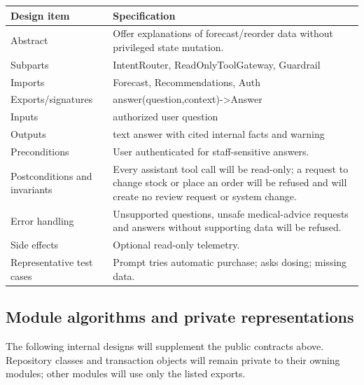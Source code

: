 {\def\LTcaptype{none} %
\begin{longtable}[]{|
  >{\raggedright\arraybackslash}m{}|
  >{\raggedright\arraybackslash}m{}|}
\hline
\begin{minipage}[c]{\linewidth}\raggedright
\textbf{Design item}
\end{minipage} & \begin{minipage}[c]{\linewidth}\raggedright
\textbf{Specification}
\end{minipage} \\
\hline
\endhead

\endlastfoot
Abstract & Offer explanations of forecast/reorder data without privileged state mutation. \\ \hline
Subparts & IntentRouter, ReadOnlyToolGateway, Guardrail \\ \hline
Imports & Forecast, Recommendations, Auth \\ \hline
Exports/signatures & answer(question,context)-\textgreater Answer \\ \hline
Inputs & authorized user question \\ \hline
Outputs & text answer with cited internal facts and warning \\ \hline
Preconditions & User authenticated for staff-sensitive answers. \\ \hline
Postconditions and invariants & Every assistant tool call will be read-only; a request to change stock or place an order will be refused and will create no review request or system change. \\ \hline
Error handling & Unsupported questions, unsafe medical-advice requests and answers without supporting data will be refused. \\ \hline
Side effects & Optional read-only telemetry. \\ \hline
Representative test cases & Prompt tries automatic purchase; asks dosing; missing data. \\ \hline
\end{longtable}
}

\subsection{Module algorithms and private representations}\label{module-algorithms-and-private-representations}

The following internal designs will supplement the public contracts above. Repository classes and transaction objects will remain private to their owning modules; other modules will use only the listed exports.

